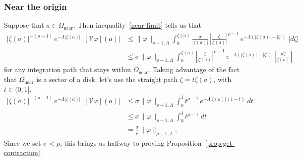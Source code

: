 \documentclass{article}
\theoremstyle{plain}
\newcommand{\volterra}{\mathcal{V}}
\newcommand{\near}{\Omega_\text{near}}
\begin{document}
\subsubsection{Near the origin}\label{near-bound}
Suppose that $a \in \near$. Then inequality~\eqref{near-limit} tells us that
\begin{align*}
|\zeta(a)|^{-(\rho-1)}\,e^{-\Lambda|\zeta(a)|}\,|[\volterra\varphi](a)| & \le
\|\varphi\|_{\rho-1, \Lambda} \int_0^{\zeta(a)} \frac{\sigma}{|\zeta(a)|}\,\left|\frac{\zeta}{\zeta(a)}\right|^{\rho-1}\,e^{-\Lambda(|\zeta(a)| - |\zeta|)}\;|d\zeta| \\
& \le \sigma \|\varphi\|_{\rho-1, \Lambda} \int_0^{\zeta(a)} \left|\frac{\zeta}{\zeta(a)}\right|^{\rho-1}\,e^{-\Lambda(|\zeta(a)| - |\zeta|)}\;\left|\frac{d\zeta}{\zeta(a)}\right|
\end{align*}
for any integration path that stays within $\near$. Taking advantage of the fact that $\near$ is a sector of a disk, let's use the straight path $\zeta = t \zeta(a)$, with $t \in (0, 1]$.
\begin{align*}
|\zeta(a)|^{-(\rho-1)}\,e^{-\Lambda|\zeta(a)|}\,|[\volterra\varphi](a)| & \le \sigma \|\varphi\|_{\rho-1, \Lambda} \int_0^1 t^{\rho-1}\,e^{-\Lambda |\zeta(a)|(1 - t)}\;dt \\
& \le \sigma \|\varphi\|_{\rho-1, \Lambda} \int_0^1 t^{\rho-1}\;dt \\
& = \frac{\sigma}{\rho} \|\varphi\|_{\rho-1, \Lambda}.
\end{align*}
Since we set $\sigma < \rho$, this brings us halfway to proving Proposition~\ref{prop:get-contraction}.
\end{document}
